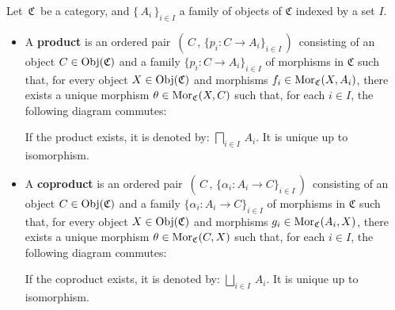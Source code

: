\vskip 0.5cm
\begin{definition}
\mbox{}
\vskip 0.15cm
\noindent
Let \,$\mathfrak{C}$\, be a category, and
$\{\,A_{i}\,\}_{i \in I}$ a family of objects of $\mathfrak{C}$ indexed by a set $I$.
\begin{itemize}
\item
	A \textbf{product} is an ordered pair
	\,$\left(\,C\,,\,\{p_{i} : C \longrightarrow A_{i}\}_{i \in I}\,\right)$\,
	consisting of an object $C \in \textnormal{Obj}(\mathfrak{C})$ and a family 
	$\{p_{i} : C \longrightarrow A_{i}\}_{i \in I}$ of morphisms in $\mathfrak{C}$
	such that,
	for every object $X \in \textnormal{Obj}(\mathfrak{C})$ and morphisms $f_{i} \in \textnormal{Mor}_{\mathfrak{C}}(X,A_{i})$,
	there exists a unique morphism $\theta \in \textnormal{Mor}_{\mathfrak{C}}(X,C)$ such that,
	for each $i \in I$, the following diagram commutes:
	\begin{center}
	\end{center}
	If the product exists, it is denoted by: $\underset{i \in I}{\bigsqcap}\,A_{i}$.
	It is unique up to isomorphism.
\item
	A \textbf{coproduct} is an ordered pair
	\,$\left(\,C\,,\,\{\alpha_{i} : A_{i} \longrightarrow C\}_{i \in I}\,\right)$\,
	consisting of an object $C \in \textnormal{Obj}(\mathfrak{C})$ and a family 
	$\{\alpha_{i} : A_{i} \longrightarrow C\}_{i \in I}$ of morphisms in $\mathfrak{C}$
	such that,
	for every object $X \in \textnormal{Obj}(\mathfrak{C})$ and morphisms $g_{i} \in \textnormal{Mor}_{\mathfrak{C}}(A_{i},X)$,
	there exists a unique morphism $\theta \in \textnormal{Mor}_{\mathfrak{C}}(C,X)$ such that,
	for each $i \in I$, the following diagram commutes:
	\begin{center}
	\end{center}
	If the coproduct exists, it is denoted by: $\underset{i \in I}{\bigsqcup}\,A_{i}$.
	It is unique up to isomorphism.
\end{itemize}
\end{definition}

